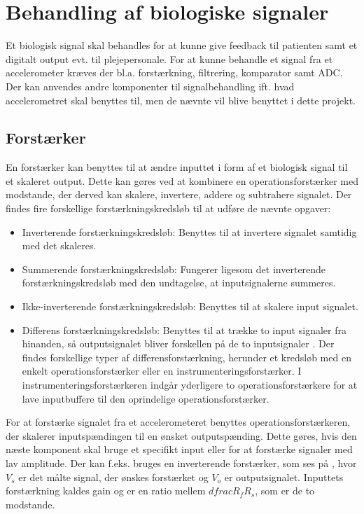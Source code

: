 \section{Behandling af biologiske signaler}
Et biologisk signal skal behandles for at kunne give feedback til patienten samt et digitalt output evt. til plejepersonale. For at kunne behandle et signal fra et accelerometer kræves der bl.a. forstærkning, filtrering, komparator samt ADC. Der kan anvendes andre komponenter til signalbehandling ift. hvad accelerometret skal benyttes til, men de nævnte vil blive benyttet i dette projekt. 

\subsection{Forstærker}\label{forstaerkerafsnit}
En forstærker kan benyttes til at ændre inputtet i form af et biologisk signal til et skaleret output. Dette kan gøres ved at kombinere en operationsforstærker med modstande, der derved kan skalere, invertere, addere og subtrahere signalet. Der findes fire forskellige forstærkningskredsløb til at udføre de nævnte opgaver: \cite{Nilsson2011}
\begin{itemize}
\item Inverterende forstærkningskredsløb: Benyttes til at invertere signalet samtidig med det skaleres.%
\item Summerende forstærkningskredsløb: Fungerer ligesom det inverterende forstærkningskredsløb med den undtagelse, at inputsignalerne summeres.
\item Ikke-inverterende forstærkningskredsløb: Benyttes til at skalere input signalet.
\item Differens forstærkningskredsløb: Benyttes til at trække to input signaler fra hinanden, så outputsignalet bliver forskellen på de to inputsignaler \cite{Nilsson2011}. Der findes forskellige typer af differensforstærkning, herunder et kredsløb med en enkelt operationsforstærker eller en instrumenteringsforstærker. I instrumenteringsforstærkeren indgår yderligere to operationsforstærkere for at lave inputbuffere til den oprindelige operationsforstærker. \cite{Sedra2010}  
\end{itemize} 

\noindent For at forstærke signalet fra et accelerometeret benyttes operationsforstærkeren, der skalerer inputspændingen til en ønsket outputspænding. Dette gøres, hvis den næste komponent skal bruge et specifikt input eller for at forstærke signaler med lav amplitude. Der kan f.eks. bruges en inverterende forstærker, som ses på , hvor $V_{s}$ er det målte signal, der ønskes forstærket og $V_{o}$ er outputsignalet. Inputtets forstærkning kaldes gain og er en ratio mellem $dfrac{R_{f}}{R_{s}}$, som er de to modstande. \cite{Nilsson2011}

